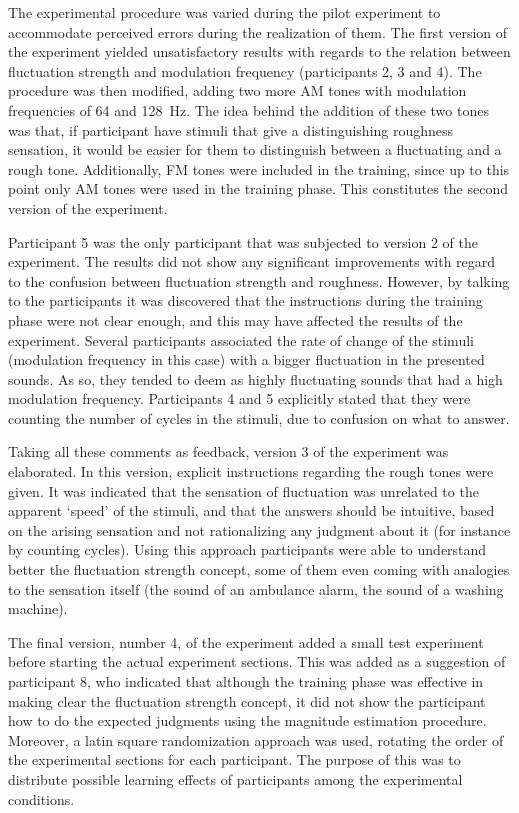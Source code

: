 \documentclass[../main.tex]{subfiles}
\begin{document}
The experimental procedure was varied during the pilot experiment to accommodate
perceived errors during the realization of them. The first version of the
experiment yielded unsatisfactory results with regards to the relation between
fluctuation strength and modulation frequency (participants 2, 3 and 4). The
procedure was then modified, adding two more AM tones with modulation
frequencies of 64 and 128~Hz. The idea behind the addition of these two tones
was that, if participant have stimuli that give a distinguishing roughness
sensation, it would be easier for them to distinguish between a fluctuating and
a rough tone. Additionally, \gls{FM} tones were included in the training, since
up to this point only \gls{AM} tones were used in the training phase. This
constitutes the second version of the experiment.

Participant 5 was the only participant that was subjected to version 2 of the
experiment. The results did not show any significant improvements with regard
to the confusion between fluctuation strength and roughness. However, by talking
to the participants it was discovered that the instructions during the training
phase were not clear enough, and this may have affected the results of the
experiment. Several participants associated the rate of change of the stimuli
(modulation frequency in this case) with a bigger fluctuation in the presented
sounds. As so, they tended to deem as highly fluctuating sounds that had a high
modulation frequency. Participants 4 and 5 explicitly stated that they were
counting the number of cycles in the stimuli, due to confusion on what to
answer.

Taking all these comments as feedback, version 3 of the experiment was
elaborated. In this version, explicit instructions regarding the rough tones
were given. It was indicated that the sensation of fluctuation was unrelated to
the apparent `speed' of the stimuli, and that the answers should be intuitive,
based on the arising sensation and not rationalizing any judgment about it
(for instance by counting cycles). Using this approach participants were able to
understand better the fluctuation strength concept, some of them even coming
with analogies to the sensation itself (the sound of an ambulance alarm, the
sound of a washing machine).

The final version, number 4, of the experiment added a small test experiment
before starting the actual experiment sections. This was added as a suggestion
of participant 8, who indicated that although the training phase was effective
in making clear the fluctuation strength concept, it did not show the
participant how to do the expected judgments using the magnitude estimation
procedure. Moreover, a latin square randomization approach was used, rotating
the order of the experimental sections for each participant. The purpose of this
was to distribute possible learning effects of participants among the
experimental conditions.
\end{document}
